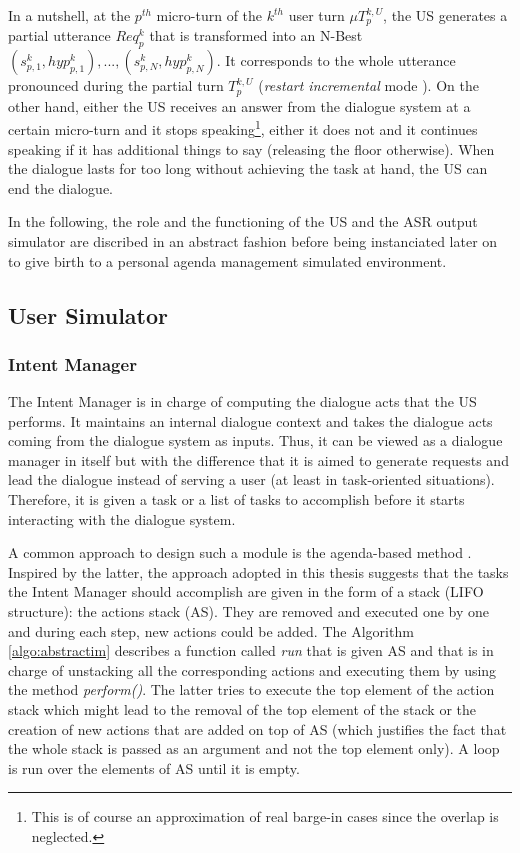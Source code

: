 				In a nutshell, at the $p^{th}$ micro-turn of the $k^{th}$ user turn $\mu T^{k,U}_p$, the US generates a partial utterance $Req^k_p$ that is transformed into an N-Best ${(s^k_{p,1}, hyp^k_{p,1}),...,(s^k_{p,N}, hyp^k_{p,N})}$. It corresponds to the whole utterance pronounced during the partial turn $T^{k,U}_p$ (\textit{restart incremental} mode \cite{Schlangen2011}). On the other hand, either the US receives an answer from the dialogue system at a certain micro-turn and it stops speaking\footnote{This is of course an approximation of real barge-in cases since the overlap is neglected.}, either it does not and it continues speaking if it has additional things to say (releasing the floor otherwise). When the dialogue lasts for too long without achieving the task at hand, the US can end the dialogue.

                                In the following, the role and the functioning of the US and the ASR output simulator are discribed in an abstract fashion before being instanciated later on to give birth to a personal agenda management simulated environment.
    
	\subsection{User Simulator}

			\subsubsection{Intent Manager}
			\label{subsec:intentmanager}

					The Intent Manager is in charge of computing the dialogue acts that the US performs. It maintains an internal dialogue context and takes the dialogue acts coming from the dialogue system as inputs. Thus, it can be viewed as a dialogue manager in itself but with the difference that it is aimed to generate requests and lead the dialogue instead of serving a user (at least in task-oriented situations). Therefore, it is given a task or a list of tasks to accomplish before it starts interacting with the dialogue system.

					A common approach to design such a module is the agenda-based method \cite{Wei1999,Schatzmann2007}. Inspired by the latter, the approach adopted in this thesis suggests that the tasks the Intent Manager should accomplish are given in the form of a stack (LIFO structure): the actions stack (AS). They are removed and executed one by one and during each step, new actions could be added. The Algorithm \ref{algo:abstractim} describes a function called \textit{run} that is given AS and that is in charge of unstacking all the corresponding actions and executing them by using the method \textit{perform()}. The latter tries to execute the top element of the action stack which might lead to the removal of the top element of the stack or the creation of new actions that are added on top of AS (which justifies the fact that the whole stack is passed as an argument and not the top element only). A loop is run over the elements of AS until it is empty.


